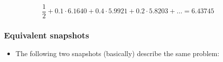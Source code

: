 \documentclass{beamer}
\begin{document}
\begin{frame}
  \begin{equation*}
    \frac{1}{2}
    + 0.1 \cdot 6.1640
    + 0.4 \cdot 5.9921
    + 0.2 \cdot 5.8203
    + \dots
    = 6.43745
  \end{equation*}
\end{frame}

\begin{frame}
  \frametitle{Equivalent snapshots}
  \begin{itemize}
  \item The following two snapshots (basically) describe the same problem:
  \end{itemize}
\end{frame}
\end{document}
